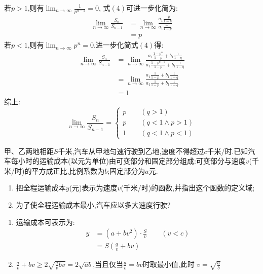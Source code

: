 \documentclass[answers]{exam}
\begin{document}
\begin{questions}
\begin{solution}
		若$p>1$,则有$\displaystyle\lim_{n\to\infty}\frac{1}{p^{n-1}} = 0$, 式$(4)$可进一步化简为:
		\begin{align*}
			\lim_{n\to\infty}\frac{S_n}{S_{n-1}} & = \lim_{n\to\infty}\frac{a_1\frac{-p}{1-p}}{a_1\frac{-1}{1-p}} \\
			                                     & = p
		\end{align*}
		若$p<1$,则有$\displaystyle\lim_{n\to\infty}p^n=0$.进一步化简式$(4)$得:
		\begin{align*}
			\lim_{n\to\infty}\frac{S_n}{S_{n-1}} & =
			\lim_{n\to\infty}\frac{a_1\frac{1-p^n}{1-p} + b_1\frac{1}{1-q}}{a_1\frac{1-p^{n-1}}{1-p} + b_1\frac1{1-q}}
			\\
			                                     & = \lim_{n\to\infty}\frac{a_1\frac{1}{1-p}
			+b_1\frac1{1-q}}{a_1\frac{1}{1-p} + b_1\frac1{1-q}}                              \\
			                                     & = 1
		\end{align*}
		综上:
		\begin{equation*}
			\lim_{n\to\infty}\frac{S_n}{S_{n-1}}  =
			\begin{cases}
				p \qquad (q >1)              \\
				p \qquad (q < 1 \land p > 1) \\
				1 \qquad (q < 1 \land p < 1)
			\end{cases}
		\end{equation*}
	\end{solution}

	\question
	甲、乙两地相距$S$千米,汽车从甲地匀速行驶到乙地,速度不得超过$c$千米/时.已知汽车每小时的运输成本(以元为单位)由可变部分和固定部分组成:可变部分与速度$v$(千米/时)的平方成正比,比例系数为$b$;固定部分为$a$元.
	\begin{enumerate}[label=(\arabic*)]
		\item 把全程运输成本$y$(元)表示为速度$v$(千米/时)的函数,并指出这个函数的定义域;
		\item 为了使全程运输成本最小,汽车应以多大速度行驶?
	\end{enumerate}

	\begin{solution}
		\begin{enumerate}[label=(\arabic*)]
			\item 运输成本可表示为:
			      \begin{align*}
				      y & = (a + bv^2)\cdot \frac{S}{v} \qquad(v < c) \\
				        & = S(\frac{a}{v}+ bv)
			      \end{align*}
			\item $\frac{a}{v} + bv \geqslant 2\sqrt{\frac{a}{v}bv} = 2\sqrt{ab}$,当且仅当$\frac{a}{v} =
				      bv$时取最小值,此时 $v=\sqrt{\frac{a}{b}}$
		\end{enumerate}


\end{solution}
\end{questions}
\end{document}
